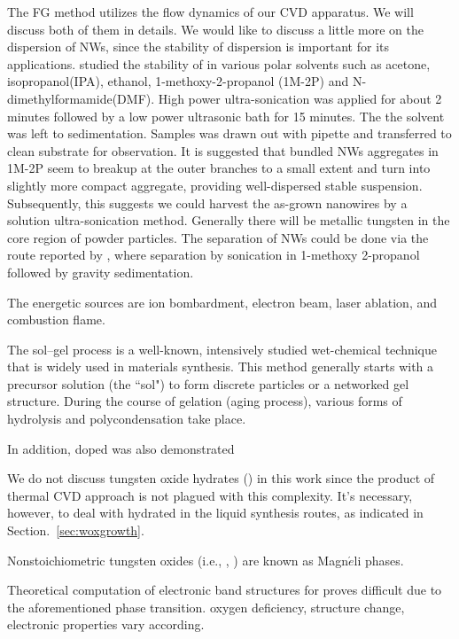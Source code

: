 The FG method utilizes the flow dynamics of our CVD apparatus. We will discuss both of them in details.
We would like to discuss a little more on the dispersion of  NWs, since the stability of  dispersion is important for its applications. \citeauthor{Kozan2008} studied the stability of  in various polar solvents such as acetone, isopropanol(IPA), ethanol, 1-methoxy-2-propanol (1M-2P) and N-dimethylformamide(DMF).\cite{Kozan2008} High power ultra-sonication was applied for about 2 minutes followed by a low power ultrasonic bath for 15 minutes. The the solvent was left to sedimentation. Samples was drawn out with pipette and transferred to clean substrate for observation. It is suggested that bundled NWs aggregates in 1M-2P seem to breakup at the outer branches to a small extent and turn into slightly more compact aggregate, providing well-dispersed stable suspension. Subsequently, this suggests we could harvest the as-grown nanowires by a solution ultra-sonication method. Generally there will be metallic tungsten in the core region of powder particles. The separation of NWs could be done via the route reported by \citeauthor{Kumar2008}, where separation by sonication in 1-methoxy 2-propanol followed by gravity sedimentation.\cite{Kozan2008}


The energetic sources are ion bombardment, electron beam, laser ablation, and combustion flame\cite{Rao2011}.

The sol–gel process is a well-known, intensively studied wet-chemical technique that is widely used in materials synthesis. This method generally starts with a precursor solution (the ``sol") to form discrete particles or a networked gel structure. During the course of gelation (aging process), various forms of hydrolysis and polycondensation take place.

In addition, doped  was also demonstrated

We do not discuss tungsten oxide hydrates () in this work since the product of thermal CVD approach is not plagued with this complexity. It's necessary, however, to deal with hydrated  in the liquid synthesis routes, as indicated in Section.~\ref{sec:woxgrowth}.


Nonstoichiometric tungsten oxides  (i.e., , ) are known as Magn$\acute{e}$li phases.


Theoretical computation of electronic band structures for  proves difficult due to the aforementioned phase transition. oxygen deficiency, structure change, electronic properties vary according.

